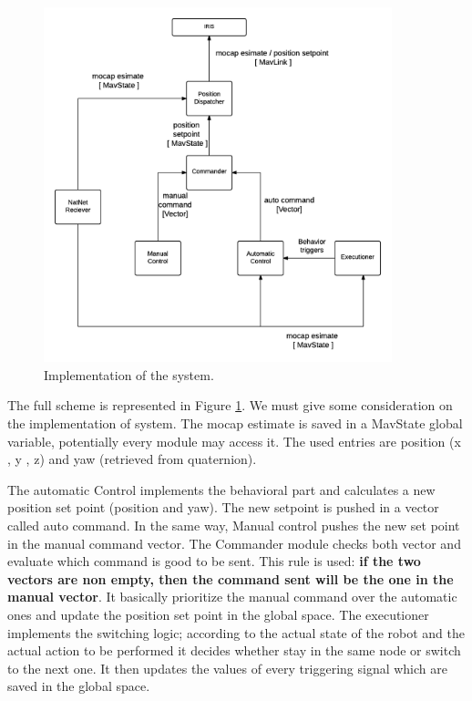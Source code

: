 \begin{figure}[h]
\centering
 \includegraphics[width=0.9\textwidth]{arch_scheme.png}
 \caption[Achtitecture scheme]{Implementation of the system.}
 \label{figure:archscheme}
\end{figure}
The full scheme is represented in Figure \ref{figure:archscheme}. We must give some consideration on the implementation of system. The mocap estimate is saved in a MavState global variable, potentially every module may access it. The used entries are position (x , y , z) and yaw (retrieved from quaternion).

The automatic Control implements the behavioral part and calculates a new position set point (position and yaw). The new setpoint is pushed in a vector called auto command. In the same way, Manual control pushes the new set point in the manual command vector. The Commander module checks both vector and evaluate which command is good to be sent. This rule is used: \textbf{if the two vectors are non empty, then the command sent will be the one in the manual vector}. It basically prioritize the manual command over the automatic ones and update the position set point in the global space. The executioner implements the switching logic; according to the actual state of the robot and the actual action to be performed it decides whether stay in the same node or switch to the next one. It then updates the values of every triggering signal which are saved in the global space.

